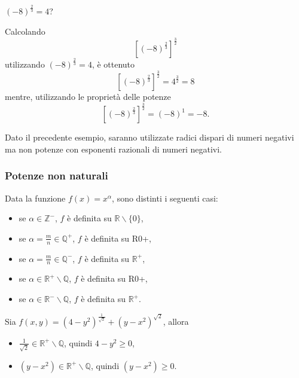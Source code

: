 \begin{example}
    $(-8)^{\frac{2}{3}}=4$?
    
    Calcolando
    \begin{equation*}
        \left[(-8)^{\frac{2}{3}}\right]^{\frac{3}{2}}
    \end{equation*}
    utilizzando $(-8)^{\frac{2}{3}}=4$, è ottenuto 
    \begin{equation*}
        \left[(-8)^{\frac{2}{3}}\right]^{\frac{3}{2}}=4^{\frac{3}{2}}=8
    \end{equation*}
    mentre, utilizzando le proprietà delle potenze
    \begin{equation*}
        \left[(-8)^{\frac{2}{3}}\right]^{\frac{3}{2}}=(-8)^1=-8.
    \end{equation*}
\end{example}

Dato il precedente esempio, saranno utilizzate radici dispari di numeri negativi ma non potenze con esponenti razionali di numeri negativi.

\subsubsection{Potenze non naturali}
Data la funzione $f(x)=x^\alpha$, sono distinti i seguenti casi:
\begin{itemize}
    \item se $\alpha\in\mathbb Z^-$, $f$ è definita su $\mathbb R\backslash\{0\}$,
    \item se $\alpha=\frac{m}{n}\in\mathbb Q^+$, $f$ è definita su \gls{R0+},
    \item se $\alpha=\frac{m}{n}\in\mathbb Q^-$, $f$ è definita su $\mathbb R^+$,
    \item se $\alpha\in\mathbb R^+\backslash\mathbb Q$, $f$ è definita su \gls{R0+},
    \item se $\alpha\in\mathbb R^-\backslash\mathbb Q$, $f$ è definita su $\mathbb R^+$.
\end{itemize}

\begin{example}
    Sia $f(x,y) = (4 - y^2)^{\frac{1}{\sqrt{2}}} + (y-x^2)^{\sqrt{2}}$, allora
    \begin{itemize}
        \item $\frac{1}{\sqrt{2}}\in\mathbb R^+\backslash\mathbb Q$, quindi $4 - y^2\geq 0$,
        \item $(y-x^2)\in\mathbb R^+\backslash\mathbb Q$, quindi $(y-x^2)\geq 0$.
    \end{itemize}
\end{example}

